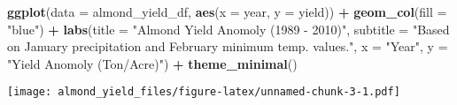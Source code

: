 \documentclass[
]{article}
\newenvironment{Shaded}{\begin{snugshade}}{\end{snugshade}}
\newcommand{\DataTypeTok}[1]{\textcolor[rgb]{0.13,0.29,0.53}{#1}}
\newcommand{\KeywordTok}[1]{\textcolor[rgb]{0.13,0.29,0.53}{\textbf{#1}}}
\newcommand{\NormalTok}[1]{#1}
\newcommand{\OperatorTok}[1]{\textcolor[rgb]{0.81,0.36,0.00}{\textbf{#1}}}
\newcommand{\StringTok}[1]{\textcolor[rgb]{0.31,0.60,0.02}{#1}}
\begin{document}
\begin{Shaded}
\begin{Highlighting}[]
\KeywordTok{ggplot}\NormalTok{(}\DataTypeTok{data =}\NormalTok{ almond_yield_df, }\KeywordTok{aes}\NormalTok{(}\DataTypeTok{x =}\NormalTok{ year, }\DataTypeTok{y =}\NormalTok{ yield)) }\OperatorTok{+}
\StringTok{  }\KeywordTok{geom_col}\NormalTok{(}\DataTypeTok{fill =} \StringTok{"blue"}\NormalTok{) }\OperatorTok{+}
\StringTok{  }\KeywordTok{labs}\NormalTok{(}\DataTypeTok{title =} \StringTok{"Almond Yield Anomoly (1989 - 2010)"}\NormalTok{,}
       \DataTypeTok{subtitle =} \StringTok{"Based on January precipitation and February minimum temp. values."}\NormalTok{,}
       \DataTypeTok{x =} \StringTok{"Year"}\NormalTok{,}
       \DataTypeTok{y =} \StringTok{"Yield Anomoly (Ton/Acre)"}\NormalTok{) }\OperatorTok{+}
\StringTok{  }\KeywordTok{theme_minimal}\NormalTok{()}
\end{Highlighting}
\end{Shaded}

\texttt{[image: almond\_yield\_files/figure-latex/unnamed-chunk-3-1.pdf]}
\end{document}
